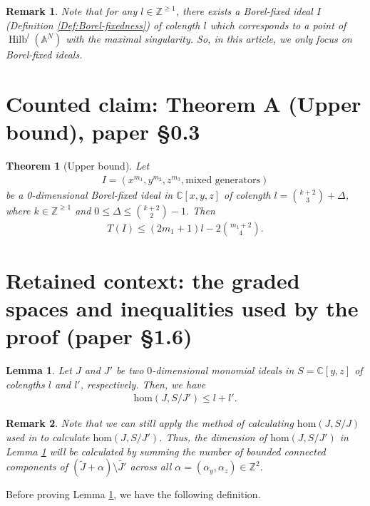 \documentclass[10pt,a4paper]{amsart}
\newcommand{\BA}{{\mathbb{A}}}
\newcommand{\BC}{{\mathbb{C}}}
\newcommand{\BZ}{{\mathbb{Z}}}
\DeclareMathOperator{\Hilb}{Hilb}
\newtheorem{thm}{Theorem}
\newtheorem{lemma}{Lemma}
\newtheorem{remark}{Remark}
\begin{document}
\begin{remark}\label{rem:Borel-fixed only}
    Note that for any $l\in \BZ^{\geq 1}$, there exists a Borel-fixed ideal $I$ (Definition \ref{Def:Borel-fixedness}) of colength $l$ which corresponds to a point of $\Hilb^l(\BA^N)$  with the maximal singularity. So, in this article, we only focus on Borel-fixed ideals.
    \end{remark}

\section*{Counted claim: Theorem A (Upper bound), paper \S0.3}
\begin{thm}[Upper bound]\label{thm:upperbound}
    Let 
    \begin{align*}
        I=(x^{m_1},y^{m_2},z^{m_3},\text{mixed generators})
    \end{align*}
    be a 0-dimensional Borel-fixed ideal in $\BC[x,y,z]$ of colength $l=\binom{k+2}{3}+\Delta$, where $k\in\BZ^{\geq1}$ and $0\leq \Delta \leq \binom{k+2}{2}-{1}$. Then 
    \begin{align*}
        T(I)
        \leq 
    (2m_1+1)l-2\binom{m_1+2}{4}. 
    \end{align*}
\end{thm}

\section*{Retained context: the graded spaces and inequalities used by the proof (paper \S1.6)}
\begin{lemma}\label{Lem:inequalityL1L2}
    Let $J$ and $J'$ be two $0$-dimensional monomial ideals in $S=\BC[y,z]$ of colengths $l$ and $l'$, respectively. Then, we have
    \begin{align}\label{eq: Ineq}
       \mathrm{hom}(J,S/J')\leq l+l'.
    \end{align}
\end{lemma}


\begin{remark}Note that we can still apply the method of calculating $\mathrm{hom}(J,S/J)$ used in \cite{Ramkumar-Sammartano} to calculate $\mathrm{hom}(J,S/J')$. Thus, the dimension of $\mathrm{hom}(J,S/J')$ in Lemma \ref{Lem:inequalityL1L2} will be calculated by summing the number of bounded connected components of $(\tilde{J}+\alpha)\setminus \tilde{J'}$ across all $\alpha=(\alpha_y,\alpha_z)\in\BZ^2$.
\end{remark}
Before proving Lemma \ref{Lem:inequalityL1L2}, we have the following definition.
\end{document}

